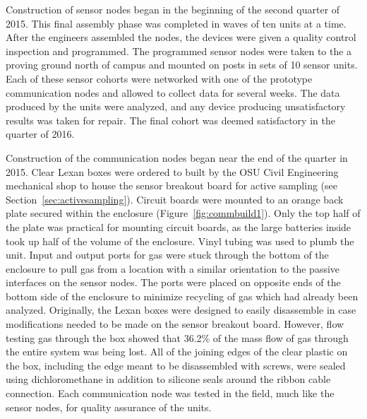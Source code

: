 \documentclass[numbook, envcountsect, envcountsame, envcountreset, runningheads, twocolumn]{svjour3}
\begin{document}
		Construction of sensor nodes began in the beginning of the second quarter of 2015.   This final assembly phase was completed in waves of ten units at a time.  After the engineers assembled the nodes, the devices were given a quality control inspection and programmed.  The programmed sensor nodes were taken to the a proving ground north of campus and mounted on posts in sets of 10 sensor units.  Each of these sensor cohorts were networked with one of the prototype communication nodes and allowed to collect data for several weeks.  The data produced by the units were analyzed, and any device producing unsatisfactory results was taken for repair.  The final cohort was deemed satisfactory in the  quarter of 2016.
		
		Construction of the communication nodes began near the end of the  quarter in 2015.  Clear Lexan boxes were ordered to built by the OSU Civil Engineering mechanical shop to house the sensor breakout board for active sampling (see Section~\ref{sec:activesampling}).  Circuit boards were mounted to an orange back plate secured within the enclosure (Figure~\ref{fig:commbuild1}).  Only the top half of the plate was practical for mounting circuit boards, as the large batteries inside took up half of the volume of the enclosure.  Vinyl tubing was used to plumb the unit.  Input and output ports for gas were stuck through the bottom of the enclosure to pull gas from a location with a similar orientation to the passive interfaces on the sensor nodes.  The ports were placed on opposite ends of the bottom side of the enclosure to minimize recycling of gas which had already been analyzed.    Originally, the Lexan boxes were designed to easily disassemble in case modifications needed to be made on the sensor breakout board.  However, flow testing gas through the box showed that 36.2\% of the mass flow of gas through the entire system was being lost.  All of the joining edges of the clear plastic on the box, including the edge meant to be disassembled with screws, were sealed using dichloromethane in addition to silicone seals around the ribbon cable connection.  Each communication node was tested in the field, much like the sensor nodes, for quality assurance of the units.  
		
\end{document}
